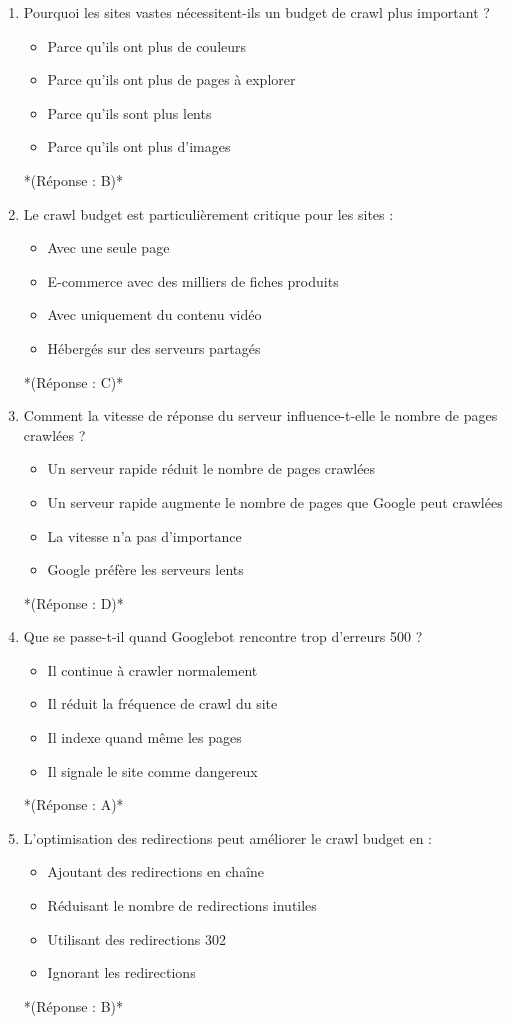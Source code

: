 \documentclass[12pt,a4paper,twoside]{report}
\begin{document}
\begin{enumerate}
\item Pourquoi les sites vastes nécessitent-ils un budget de crawl plus important ?
\begin{itemize}
\item[A)] Parce qu'ils ont plus de couleurs
\item[B)] Parce qu'ils ont plus de pages à explorer
\item[C)] Parce qu'ils sont plus lents
\item[D)] Parce qu'ils ont plus d'images
\end{itemize}
*(Réponse : B)*

\item Le crawl budget est particulièrement critique pour les sites :
\begin{itemize}
\item[A)] Avec une seule page
\item[B)] E-commerce avec des milliers de fiches produits
\item[C)] Avec uniquement du contenu vidéo
\item[D)] Hébergés sur des serveurs partagés
\end{itemize}
*(Réponse : C)*

\item Comment la vitesse de réponse du serveur influence-t-elle le nombre de pages crawlées ?
\begin{itemize}
\item[A)] Un serveur rapide réduit le nombre de pages crawlées
\item[B)] Un serveur rapide augmente le nombre de pages que Google peut crawlées
\item[C)] La vitesse n'a pas d'importance
\item[D)] Google préfère les serveurs lents
\end{itemize}
*(Réponse : D)*

\item Que se passe-t-il quand Googlebot rencontre trop d'erreurs 500 ?
\begin{itemize}
\item[A)] Il continue à crawler normalement
\item[B)] Il réduit la fréquence de crawl du site
\item[C)] Il indexe quand même les pages
\item[D)] Il signale le site comme dangereux
\end{itemize}
*(Réponse : A)*

\item L'optimisation des redirections peut améliorer le crawl budget en :
\begin{itemize}
\item[A)] Ajoutant des redirections en chaîne
\item[B)] Réduisant le nombre de redirections inutiles
\item[C)] Utilisant des redirections 302
\item[D)] Ignorant les redirections
\end{itemize}
*(Réponse : B)*


\end{enumerate}
\end{document}
